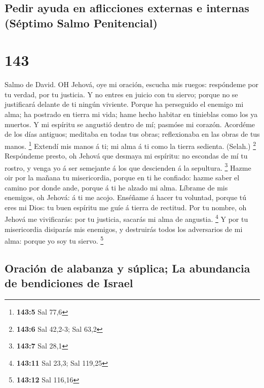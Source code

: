 \hypertarget{pedir-ayuda-en-aflicciones-externas-e-internas-suxe9ptimo-salmo-penitencial}{%
\subsection{Pedir ayuda en aflicciones externas e internas (Séptimo
Salmo
Penitencial)}\label{pedir-ayuda-en-aflicciones-externas-e-internas-suxe9ptimo-salmo-penitencial}}

\hypertarget{section-142}{%
\section{143}\label{section-142}}

 Salmo de David. OH Jehová, oye mi oración, escucha mis
ruegos: respóndeme por tu verdad, por tu justicia.  Y no
entres en juicio con tu siervo; porque no se justificará delante de ti
ningún viviente.  Porque ha perseguido el enemigo mi alma;
ha postrado en tierra mi vida; hame hecho habitar en tinieblas como los
ya muertos.  Y mi espíritu se angustió dentro de mí; pasmóse
mi corazón.  Acordéme de los días antiguos; meditaba en
todas tus obras; reflexionaba en las obras de tus manos. \footnote{\textbf{143:5}
  Sal 77,6}  Extendí mis manos á ti; mi alma á ti como la
tierra sedienta. (Selah.) \footnote{\textbf{143:6} Sal 42,2-3; Sal 63,2}
 Respóndeme presto, oh Jehová que desmaya mi espíritu: no
escondas de mí tu rostro, y venga yo á ser semejante á los que
descienden á la sepultura. \footnote{\textbf{143:7} Sal 28,1}
 Hazme oir por la mañana tu misericordia, porque en ti he
confiado: hazme saber el camino por donde ande, porque á ti he alzado mi
alma.  Líbrame de mis enemigos, oh Jehová: á ti me acojo.
 Enséñame á hacer tu voluntad, porque tú eres mi Dios: tu
buen espíritu me guíe á tierra de rectitud.  Por tu nombre,
oh Jehová me vivificarás: por tu justicia, sacarás mi alma de angustia.
\footnote{\textbf{143:11} Sal 23,3; Sal 119,25}  Y por tu
misericordia disiparás mis enemigos, y destruirás todos los adversarios
de mi alma: porque yo soy tu siervo. \footnote{\textbf{143:12} Sal
  116,16}

\hypertarget{oraciuxf3n-de-alabanza-y-suxfaplica-la-abundancia-de-bendiciones-de-israel}{%
\subsection{Oración de alabanza y súplica; La abundancia de bendiciones
de
Israel}\label{oraciuxf3n-de-alabanza-y-suxfaplica-la-abundancia-de-bendiciones-de-israel}}

